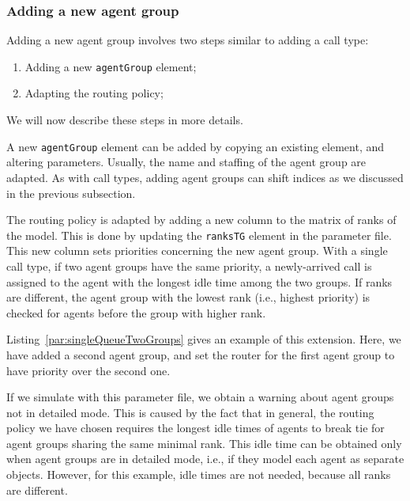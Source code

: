 

\subsubsection{Adding a new agent group}
\label{sec:addAgentGroup}

Adding a new agent group involves two steps similar to adding a call
type:
\begin{enumerate}
\item Adding a new \texttt{agent\-Group} element;
\item Adapting the routing policy;
\end{enumerate}
We will now describe these steps in more details.

A new \texttt{agent\-Group} element can be added by copying an
existing element, and altering parameters.
Usually, the name and staffing of the agent group are adapted.
As with call types, adding agent groups can shift indices as we
discussed in the previous subsection.

The routing policy is adapted by adding a new column to
the matrix of ranks of the model.  This is done by updating the
\texttt{ranksTG} element in the parameter file.
This new column sets priorities concerning the new agent
group.
With a single call type, if two agent groups have the same priority,
a newly-arrived call is assigned to the agent with the longest idle
time among the two groups.
If ranks are different, the agent group with the lowest rank (i.e.,
highest priority) is checked for agents before the group with higher
rank.

Listing~\ref{par:singleQueueTwoGroups} gives an example of this
extension.  Here, we have added a second agent group, and set the
router for the first agent group to have priority over the second one.



If we simulate with this parameter file, we obtain a warning about
agent groups not in detailed mode.  This is caused by the fact that in
general, the routing policy we have chosen requires the longest idle
times of agents to break tie for agent groups sharing the same minimal
rank.
This idle time can be obtained only when agent groups are in
detailed mode, i.e., if they model each agent as separate objects.
However, for this example, idle times are not needed, because all
ranks are different.


